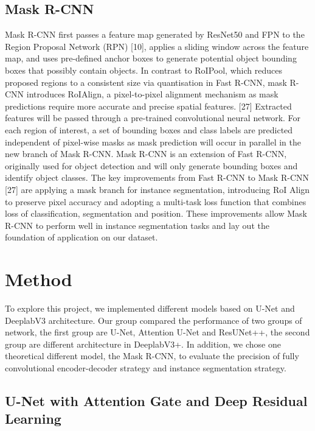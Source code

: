 \documentclass[conference]{IEEEtran}
\begin{document}
\subsection{Mask R-CNN}
Mask R-CNN first passes a feature map generated by ResNet50 and FPN to the Region Proposal Network (RPN) [10], applies a sliding window across the feature map, and uses pre-defined anchor boxes to generate potential object bounding boxes that possibly contain objects. In contrast to RoIPool, which reduces proposed regions to a consistent size via quantisation in Fast R-CNN, mask R-CNN introduces RoIAlign, a pixel-to-pixel alignment mechanism as mask predictions require more accurate and precise spatial features. [27] Extracted features will be passed through a pre-trained convolutional neural network. For each region of interest, a set of bounding boxes and class labels are predicted independent of pixel-wise masks as mask prediction will occur in parallel in the new branch of Mask R-CNN. Mask R-CNN is an extension of Fast R-CNN, originally used for object detection and will only generate bounding boxes and identify object classes. The key improvements from Fast R-CNN to Mask R-CNN [27] are applying a mask branch for instance segmentation, introducing RoI Align to preserve pixel accuracy and adopting a multi-task loss function that combines loss of classification, segmentation and position. These improvements allow Mask R-CNN to perform well in instance segmentation tasks and lay out the foundation of application on our dataset.
\section{Method}
To explore this project, we implemented different models based on U-Net and DeeplabV3 architecture. Our group compared the performance of two groups of network, the first group are U-Net, Attention U-Net and ResUNet++, the second group are different architecture in DeeplabV3+. In addition, we chose one theoretical different model, the Mask R-CNN, to evaluate the precision of fully convolutional encoder-decoder strategy and instance segmentation strategy.
\subsection{U-Net with Attention Gate and Deep Residual Learning}
\end{document}
